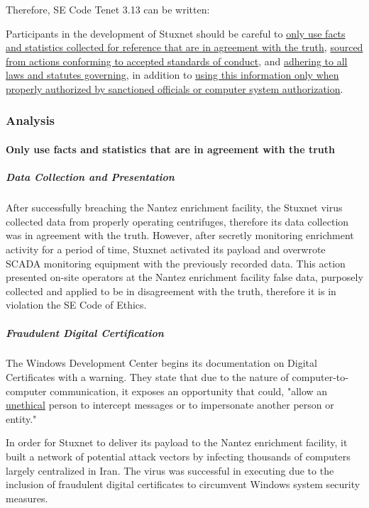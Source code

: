 \documentclass[12pt]{article}
\begin{document}
\begin{multicols}{2}
Therefore, SE Code Tenet 3.13 can be written:
\begin{framed}
Participants in the development of Stuxnet should be careful to \ul{only use facts and statistics collected for reference that are in agreement with the truth}, \ul{sourced from actions conforming to accepted standards of conduct}, and \ul{adhering to all laws and statutes governing}, in addition to \ul{using this information only when properly authorized by sanctioned officials or computer system authorization}.
\end{framed}

\subsubsection{Analysis}

\paragraph{Only use facts and statistics that are in agreement with the truth}

\subparagraph{Data Collection and Presentation}

After successfully breaching the Nantez enrichment facility, the Stuxnet virus collected data from properly operating centrifuges, therefore its data collection was in agreement with the truth. However, after secretly monitoring enrichment activity for a period of time, Stuxnet activated its payload and overwrote SCADA monitoring equipment with the previously recorded data.\cite{toKillACentrifuge} This action presented on-site operators at the Nantez enrichment facility false data, purposely collected and applied to be in disagreement with the truth, therefore it is in violation the SE Code of Ethics.

\subparagraph{Fraudulent Digital Certification}

The Windows Development Center begins its documentation on Digital Certificates with a warning. They state that due to the nature of computer-to-computer communication, it exposes an opportunity that could, "allow an \ul{unethical} person to intercept messages or to impersonate another person or entity."\cite{moreOnDigitalCertificates}

In order for Stuxnet to deliver its payload to the Nantez enrichment facility, it built a network of potential attack vectors by infecting thousands of computers largely centralized in Iran.\cite{lessonsFromStuxnet} The virus was successful in executing due to the inclusion of fraudulent digital certificates to circumvent Windows system security measures.


\end{multicols}
\end{document}

